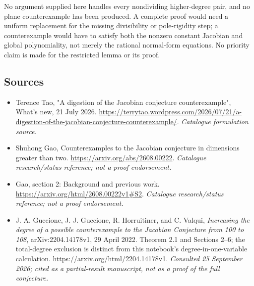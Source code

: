 \documentclass[11pt]{article}
\begin{document}
No argument supplied here handles every nondividing higher-degree pair, and
no plane counterexample has been produced. A complete proof would need a
uniform replacement for the missing divisibility or pole-rigidity step; a
counterexample would have to satisfy both the nonzero constant Jacobian and
global polynomiality, not merely the rational normal-form equations. No
priority claim is made for the restricted lemma or its proof.

\subsection{Sources}
\begin{itemize}\raggedright
\item[\textnormal{[S1]}]\hypertarget{source:30006729:1}{} Terence Tao, "A digestion of the Jacobian conjecture counterexample", What's new, 21 July 2026.
\url{https://terrytao.wordpress.com/2026/07/21/a-digestion-of-the-jacobian-conjecture-counterexample/}.
{\small\textit{Catalogue formulation source.}}
\item[\textnormal{[S2]}]\hypertarget{source:30006729:2}{} Shuhong Gao, Counterexamples to the Jacobian conjecture in dimensions greater than two.
\url{https://arxiv.org/abs/2608.00222}.
{\small\textit{Catalogue research/status reference; not a proof endorsement.}}
\item[\textnormal{[S3]}]\hypertarget{source:30006729:3}{} Gao, section 2: Background and previous work.
\url{https://arxiv.org/html/2608.00222v1#S2}.
{\small\textit{Catalogue research/status reference; not a proof endorsement.}}
\item[\textnormal{[E1]}]\hypertarget{extra:30006729:1}{}
J. A. Guccione, J. J. Guccione, R. Horruitiner, and C. Valqui,
\emph{Increasing the degree of a possible counterexample to the Jacobian
Conjecture from 100 to 108}, arXiv:2204.14178v1, 29 April 2022.
Theorem 2.1 and Sections 2--6; the total-degree exclusion is distinct from
this notebook's degree-in-one-variable calculation.
\url{https://arxiv.org/html/2204.14178v1}.
{\small\textit{Consulted 25 September 2026; cited as a partial-result
manuscript, not as a proof of the full conjecture.}}
\end{itemize}
\end{document}
